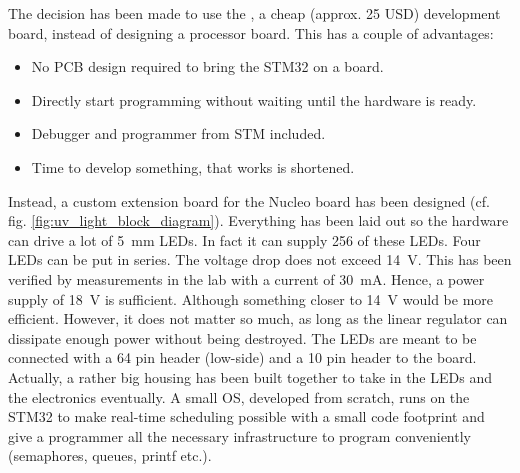 The decision has been made to use the , a cheap (approx. 25 USD) development board, instead of designing a processor board. This has a couple of advantages:
\begin{itemize}
\item No \gls{PCB} design required to bring the STM32 on a board. 
\item Directly start programming without waiting until the hardware is ready.
\item Debugger and programmer from STM included. 
\item Time to develop something, that works is shortened. 
\end{itemize}
Instead, a custom extension board for the Nucleo board has been designed (cf. fig. \ref{fig:uv_light_block_diagram}). Everything has been laid out so the hardware can drive a lot of  \SI{5}{\milli\metre} \glspl{LED}. In fact it can supply 256 of these \glspl{LED}. Four \glspl{LED} can be put in series. The voltage drop does not exceed \SI{14}{\volt}. This has been verified by measurements in the lab with a current of \SI{30}{\milli\ampere}. Hence, a power supply of \SI{18}{\volt} is sufficient. Although something closer to \SI{14}{\volt} would be more efficient. However, it does not matter so much, as long as the linear regulator can dissipate enough power without being destroyed. 
\newpar
The \glspl{LED} are meant to be connected with a 64 pin header (low-side) and a 10 pin header to the board. Actually, a rather big housing has been built together to take in the \glspl{LED} and the electronics eventually. 
\newpar 
A small \gls{OS}, developed from scratch, runs on the STM32 to make real-time scheduling possible with a small code footprint and give a programmer all the necessary infrastructure to program conveniently (semaphores, queues, printf etc.). 

